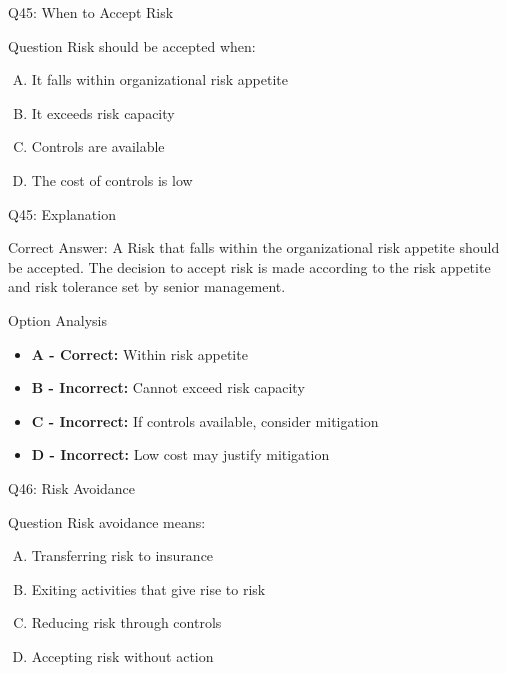 \documentclass{beamer}
\begin{document}
	\begin{frame}{Q45: When to Accept Risk}
		\begin{block}{Question}
			Risk should be accepted when:
		\end{block}
		\begin{enumerate}[(A)]
			\item It falls within organizational risk appetite
			\item It exceeds risk capacity
			\item Controls are available
			\item The cost of controls is low
		\end{enumerate}
	\end{frame}
	
	\begin{frame}{Q45: Explanation}
		\begin{block}{Correct Answer: A}
			Risk that falls within the organizational risk appetite should be accepted. The decision to accept risk is made according to the risk appetite and risk tolerance set by senior management.
		\end{block}
		\begin{block}{Option Analysis}
			\begin{itemize}
				\item \textbf{A - Correct:} Within risk appetite
				\item \textbf{B - Incorrect:} Cannot exceed risk capacity
				\item \textbf{C - Incorrect:} If controls available, consider mitigation
				\item \textbf{D - Incorrect:} Low cost may justify mitigation
			\end{itemize}
		\end{block}
	\end{frame}
	
	\begin{frame}{Q46: Risk Avoidance}
		\begin{block}{Question}
			Risk avoidance means:
		\end{block}
		\begin{enumerate}[(A)]
			\item Transferring risk to insurance
			\item Exiting activities that give rise to risk
			\item Reducing risk through controls
			\item Accepting risk without action
		\end{enumerate}
	\end{frame}
	
\end{document}
